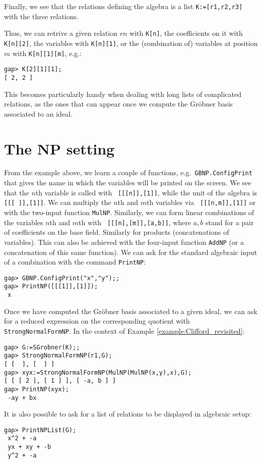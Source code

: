 \begin{example}
Finally, we see that the relations defining the algebra is a list  \texttt{K:=[r1,r2,r3]} with the three relations.

Thus, we can retrive a given relation $rn$ with \lstinline{K[n]}, the coefficients on it with \lstinline{K[n][2]}, the variables with \lstinline{K[n][1]}, or the (combination of) variables at position $m$ with \lstinline{K[n][1][m]}, e.g.:
\begin{lstlisting}
gap> K[2][1][1];
[ 2, 2 ]
\end{lstlisting}
This becomes particularly handy when dealing with long lists of complicated relations, as the ones that can appear once we compute the Gr\"obner basis associated to an ideal.
\end{example}

\section{The NP setting}

From the example above, we learn a couple of functions, e.g.~\lstinline{GBNP.ConfigPrint} that gives the name in which the variables will be printed on the screen. We see that the $n$th variable is called with \texttt{ [[[n]],[1]]}, while the unit of the algebra is \lstinline{ [[[ ]],[1]]}. We can multiply the $n$th and $m$th variables via \lstinline{ [[[n,m]],[1]]} or with the two-input function \lstinline{MulNP}. Similarly, we can form linear combinations of the variables $n$th and $m$th with \lstinline{ [[[n],[m]],[a,b]]}, where $a,b$ stand for a pair of coefficients on the base field. Similarly for products (concatenations of variables).
This can also be achieved with the  four-input function \lstinline{AddNP} (or a concatenation of this same function). We can ask for the standard algebraic input of a combination with the command \lstinline{PrintNP}:
\begin{lstlisting}
gap> GBNP.ConfigPrint("x","y");;
gap> PrintNP([[[1]],[1]]);
 x 
\end{lstlisting}
Once we have computed the Gr\"obner basis associated to a given ideal, we can ask for a reduced expression on the corresponding quotient with \lstinline{StrongNormalFormNP}. In the context of Example \ref{example:Clifford_revisited}:
\begin{lstlisting}
gap> G:=SGrobner(K);;
gap> StrongNormalFormNP(r1,G);
[ [  ], [  ] ]
gap> xyx:=StrongNormalFormNP(MulNP(MulNP(x,y),x),G);
[ [ [ 2 ], [ 1 ] ], [ -a, b ] ]
gap> PrintNP(xyx);
 -ay + bx 
\end{lstlisting}
It is also possible to ask for a list of relations to be displayed in algebraic setup:
\begin{lstlisting}
gap> PrintNPList(G);                                
 x^2 + -a 
 yx + xy + -b 
 y^2 + -a 
\end{lstlisting}

